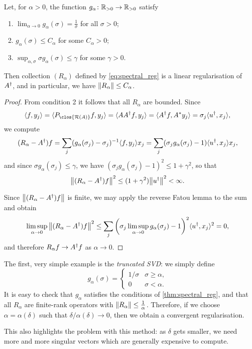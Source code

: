 \begin{theorem} \label{thm:spectral_reg}
	Let, for $\alpha > 0$, the function $g_\alpha \colon \mathbb R_{>0} \to \mathbb R_{>0}$ satisfy
	\begin{enumerate} \itemsep=0em
		\item $\lim_{\alpha \to 0} g_\alpha(\sigma) = \frac1\sigma$ for all $\sigma > 0$;
		\item $g_\alpha(\sigma) \leq C_\alpha$ for some $C_\alpha > 0$; 
		\item $\sup_{\alpha, \sigma}  \sigma g_\alpha(\sigma) \leq \gamma$ for some $\gamma > 0$. 
	\end{enumerate}
	Then collection $(R_\alpha)$ defined by \cref{eq:spectral_reg} is a linear regularisation of $A^\dagger$, and in particular, we have $\norm{R_\alpha} \leq C_\alpha$. 
\end{theorem}

\begin{proof}
	From condition 2 it follows that all $R_\alpha$ are bounded. Since 
	\[\ang{f, y_j} = \ang{P_{\clos{\Ran(A)}} f, y_j} = \ang{AA\D f, y_j} = \ang{A\D f, A^* y_j} = \sigma_j \ang{u\D, x_j},\]
	we compute
	\[
	(R_\alpha - A^\dagger) f = \sum_j (g_\alpha(\sigma_j) - \sigma_j)^{-1} \langle f, y_j\rangle x_j = \sum_j (\sigma_j g_\alpha(\sigma_j) - 1) \langle u^\dagger, x_j\rangle x_j, 
	\]
	and since $\sigma g_\alpha(\sigma_j) \leq \gamma$, we have $(\sigma_j g_\alpha(\sigma_j) - 1)^2 \leq 1 + \gamma^2$, so that 
	\[
	\norm{(R_\alpha - A^\dagger) f}^2 \leq (1 + \gamma^2) \norm{u^\dagger}^2 < \infty. 
	\]
	
	Since $\norm{(R_\alpha - A^\dagger) f}$ is finite, we may apply the reverse Fatou lemma to the sum and obtain
	\[
	\limsup_{\alpha \to 0} \norm{(R_\alpha - A^\dagger)f}^2 \leq \sum_j \qty(\sigma_j \limsup_{\alpha \to 0} g_\alpha(\sigma_j) - 1)^2 \langle u^\dagger, x_j\rangle^2 = 0,
	\]
	and therefore $R_\alpha f \to A^\dagger f$ as $\alpha \to 0$. 
\end{proof}

\begin{example}
	The first, very simple example is the \emph{truncated SVD}: we simply define
	\[
	g_\alpha(\sigma) = \begin{cases} 1/\sigma &\sigma \geq \alpha, \\ 0 &\sigma < \alpha. \end{cases}
	\]
	It is easy to check that $g_\alpha$ satisfies the conditions of \cref{thm:spectral_reg}, and that all $R_\alpha$ are finite-rank operators with $\norm{R_\alpha} \leq \frac1\alpha$. Therefore, if we choose $\alpha = \alpha(\delta)$ such that $\delta/\alpha(\delta) \to 0$, then we obtain a convergent regularisation. 
	
	This also highlights the problem with this method: as $\delta$ gets smaller, we need more and more singular vectors which are generally expensive to compute. 
\end{example}

